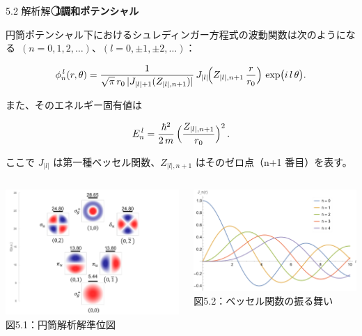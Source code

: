 \documentclass{beamer}
\begin{document}
  \begin{frame}{5.2 解析解}
  \textbf{\,\textcircled{1}\quad 調和ポテンシャル}

  円筒ポテンシャル下におけるシュレディンガー方程式の波動関数は次のようになる\ $(n = 0,1,2,\dots)$、$(l = 0,\pm1,\pm2,\dots)$：
  
  \begin{equation*}
  \phi_{n}^{\,l}(r,\theta)
  = \frac{1}{\sqrt{\pi}\,r_0\,\lvert J_{|l|+1}(Z_{|l|,n+1})\rvert}\,
  J_{|l|}\!\Bigl(Z_{|l|,n+1}\,\frac{r}{r_0}\Bigr)
  \,\exp\bigl(i\,l\,\theta\bigr).
  \end{equation*}
  
  また、そのエネルギー固有値は
  
  \begin{equation*}
  E_{n}^{\,l} 
  = \frac{\hbar^2}{2\,m}\,\Bigl(\frac{Z_{|l|,n+1}}{r_0}\Bigr)^2\,.
  \end{equation*}
  
  ここで $J_{|l|}$ は第一種ベッセル関数、$Z_{|l|,n+1}$ はそのゼロ点（n+1 番目）を表す。
  
  \begin{columns}
  \begin{center}
    \includegraphics[width=0.45\linewidth]{images/円筒準位図.png} \\
    図5.1：円筒解析解準位図
  \end{center}
  
  \begin{center}
    \includegraphics[width=0.50\linewidth]{images/ベッセル.png} \\
    図5.2：ベッセル関数の振る舞い
  \end{center}
  \end{columns}
  
  \end{frame}
  
\end{document}
